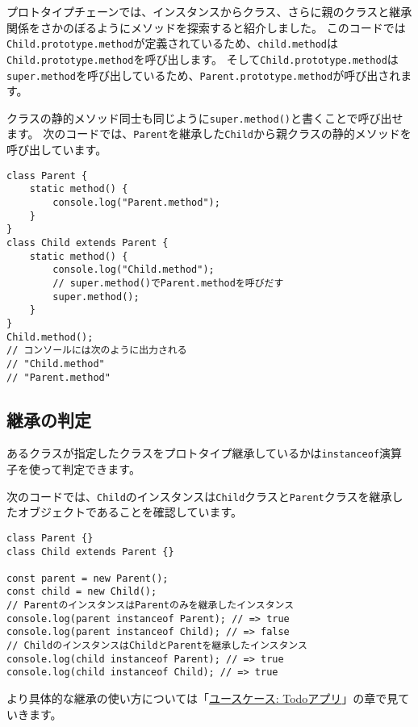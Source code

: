 プロトタイプチェーンでは、インスタンスからクラス、さらに親のクラスと継承関係をさかのぼるようにメソッドを探索すると紹介しました。
このコードでは\texttt{Child.prototype.method}が定義されているため、\texttt{child.method}は\texttt{Child.prototype.method}を呼び出します。
そして\texttt{Child.prototype.method}は\texttt{super.method}を呼び出しているため、\texttt{Parent.prototype.method}が呼び出されます。

クラスの静的メソッド同士も同じように\texttt{super.method()}と書くことで呼び出せます。
次のコードでは、\texttt{Parent}を継承した\texttt{Child}から親クラスの静的メソッドを呼び出しています。

\begin{lstlisting}
class Parent {
    static method() {
        console.log("Parent.method");
    }
}
class Child extends Parent {
    static method() {
        console.log("Child.method");
        // super.method()でParent.methodを呼びだす
        super.method();
    }
}
Child.method(); 
// コンソールには次のように出力される
// "Child.method"
// "Parent.method"
\end{lstlisting}

\hypertarget{instanceof}{%
\subsection{継承の判定}\label{instanceof}}

あるクラスが指定したクラスをプロトタイプ継承しているかは\texttt{instanceof}演算子を使って判定できます。

次のコードでは、\texttt{Child}のインスタンスは\texttt{Child}クラスと\texttt{Parent}クラスを継承したオブジェクトであることを確認しています。

\begin{lstlisting}
class Parent {}
class Child extends Parent {}

const parent = new Parent();
const child = new Child();
// ParentのインスタンスはParentのみを継承したインスタンス
console.log(parent instanceof Parent); // => true
console.log(parent instanceof Child); // => false
// ChildのインスタンスはChildとParentを継承したインスタンス
console.log(child instanceof Parent); // => true
console.log(child instanceof Child); // => true
\end{lstlisting}

より具体的な継承の使い方については「\hyperlink{todo-app}{ユースケース: Todoアプリ}」の章で見ていきます。

